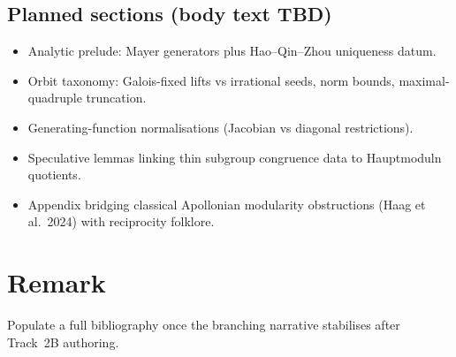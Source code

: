 \documentclass[11pt,a4paper]{article}
\theoremstyle{plain}
\theoremstyle{definition}
\theoremstyle{remark}
\numberwithin{equation}{section}
\begin{document}
\subsection*{Planned sections (body text TBD)}
\begin{itemize}
\item Analytic prelude: Mayer generators plus Hao--Qin--Zhou uniqueness datum.
\item Orbit taxonomy: Galois-fixed lifts vs irrational seeds, norm bounds, maximal-quadruple truncation.
\item Generating-function normalisations (Jacobian vs diagonal restrictions).
\item Speculative lemmas linking thin subgroup congruence data to Hauptmoduln quotients.
\item Appendix bridging classical Apollonian modularity obstructions (Haag et al.\ 2024) with reciprocity folklore.
\end{itemize}

\section*{Remark}
Populate a full bibliography once the branching narrative stabilises after Track~2B authoring.
\end{document}
